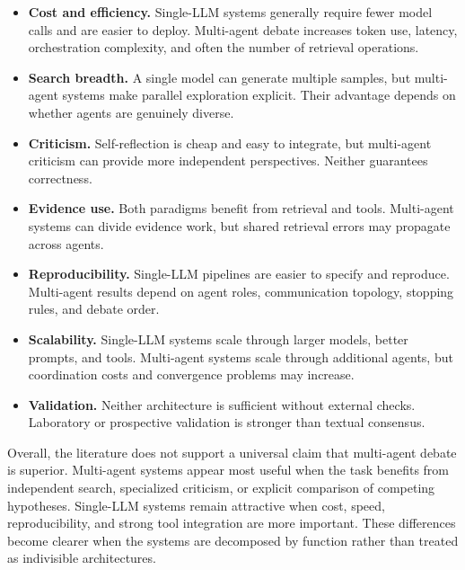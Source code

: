 \documentclass[11pt]{article}
\begin{document}
\begin{itemize}
  \item \textbf{Cost and efficiency.} Single-LLM systems generally require fewer model calls and are
  easier to deploy. Multi-agent debate increases token use, latency, orchestration complexity, and
  often the number of retrieval operations.

  \item \textbf{Search breadth.} A single model can generate multiple samples, but multi-agent systems
  make parallel exploration explicit. Their advantage depends on whether agents are genuinely
  diverse.

  \item \textbf{Criticism.} Self-reflection is cheap and easy to integrate, but multi-agent criticism can
  provide more independent perspectives. Neither guarantees correctness.

  \item \textbf{Evidence use.} Both paradigms benefit from retrieval and tools. Multi-agent systems can
  divide evidence work, but shared retrieval errors may propagate across agents.

  \item \textbf{Reproducibility.} Single-LLM pipelines are easier to specify and reproduce. Multi-agent
  results depend on agent roles, communication topology, stopping rules, and debate order.

  \item \textbf{Scalability.} Single-LLM systems scale through larger models, better prompts, and tools.
  Multi-agent systems scale through additional agents, but coordination costs and convergence
  problems may increase.

  \item \textbf{Validation.} Neither architecture is sufficient without external checks. Laboratory or
  prospective validation is stronger than textual consensus.
\end{itemize}

Overall, the literature does not support a universal claim that multi-agent debate is superior.
Multi-agent systems appear most useful when the task benefits from independent search, specialized
criticism, or explicit comparison of competing hypotheses. Single-LLM systems remain attractive
when cost, speed, reproducibility, and strong tool integration are more important. These differences
become clearer when the systems are decomposed by function rather than treated as indivisible
architectures.
\end{document}
